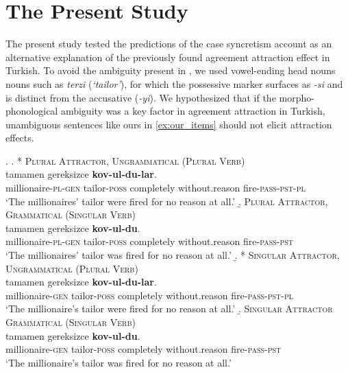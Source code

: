 \documentclass[apacite,linguex]{glossa}\usepackage[]{graphicx}\usepackage[]{color}
\begin{document}
\section{The Present Study}

The present study tested the predictions of the case syncretism account as an alternative explanation of the previously found agreement attraction effect in Turkish. To avoid the ambiguity present in \citet{LagoEtAl:2019}, we used vowel-ending head nouns nouns such as \textit{terzi} (\textit{`tailor'}), for which the possessive marker surfaces as \textit{-si} and is distinct from the accusative (\textit{-yi}). We hypothesized that if the morpho-phonological ambiguity was a key factor in agreement attraction in Turkish, unambiguous sentences like ours in \ref{ex:our_items} should not elicit attraction effects.

\ex. \label{ex:our_items}
  \a. * \textsc{Plural Attractor, Ungrammatical (Plural Verb)} \label{ex:expitem-plpl}\\
   tamamen gereksizce \textbf{kov-ul-du-lar}.\\
  millionaire-\textsc{pl}-\textsc{gen} tailor-\textsc{poss} completely without.reason fire-\textsc{pass}-\textsc{pst}-\textsc{pl}\\
  \glt `The millionaires' tailor were fired for no reason at all.'
  \b. \textsc{Plural Attractor, Grammatical (Singular Verb)} \label{ex:expitem-plsg} \\
   tamamen gereksizce \textbf{kov-ul-du}.\\
  millionaire-\textsc{pl}-\textsc{gen} tailor-\textsc{poss} completely without.reason fire-\textsc{pass}-\textsc{pst}\\
  \glt `The millionaires' tailor was fired for no reason at all.'
  \b. * \textsc{Singular Attractor, Ungrammatical (Plural Verb)} \label{ex:expitem-sgpl}\\
   tamamen gereksizce \textbf{kov-ul-du-lar}.\\
  millionaire-\textsc{gen} tailor-\textsc{poss} completely without.reason fire-\textsc{pass}-\textsc{pst}-\textsc{pl}\\
  \glt `The millionaire's tailor were fired for no reason at all.'
  \b. \textsc{Singular Attractor Grammatical (Singular Verb)} \label{ex:expitem-sgsg}\\
   tamamen gereksizce \textbf{kov-ul-du}.\\
  millionaire-\textsc{gen} tailor-\textsc{poss} completely without.reason fire-\textsc{pass}-\textsc{pst}\\
  \glt `The millionaire's tailor was fired for no reason at all.'
  
\end{document}
